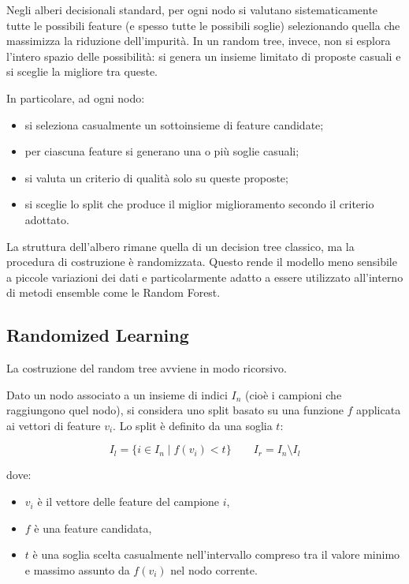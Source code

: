 Negli alberi decisionali standard, per ogni nodo si valutano sistematicamente tutte le possibili feature (e spesso tutte le possibili soglie) selezionando quella che massimizza la riduzione dell’impurità. In un random tree, invece, non si esplora l’intero spazio delle possibilità: si genera un insieme limitato di proposte casuali e si sceglie la migliore tra queste.

In particolare, ad ogni nodo:
\begin{itemize}
    \item si seleziona casualmente un sottoinsieme di feature candidate;
    \item per ciascuna feature si generano una o più soglie casuali;
    \item si valuta un criterio di qualità solo su queste proposte;
    \item si sceglie lo split che produce il miglior miglioramento secondo il criterio adottato.
\end{itemize}

La struttura dell’albero rimane quella di un decision tree classico, ma la procedura di costruzione è randomizzata. Questo rende il modello meno sensibile a piccole variazioni dei dati e particolarmente adatto a essere utilizzato all’interno di metodi ensemble come le Random Forest.

\subsection{Randomized Learning}

La costruzione del random tree avviene in modo ricorsivo. 

Dato un nodo associato a un insieme di indici $I_n$ (cioè i campioni che raggiungono quel nodo), si considera uno split basato su una funzione $f$ applicata ai vettori di feature $v_i$. Lo split è definito da una soglia $t$:

\[
I_l = \{ i \in I_n \mid f(v_i) < t \}
\qquad
I_r = I_n \setminus I_l
\]

dove:
\begin{itemize}
    \item $v_i$ è il vettore delle feature del campione $i$,
    \item $f$ è una feature candidata,
    \item $t$ è una soglia scelta casualmente nell’intervallo compreso tra il valore minimo e massimo assunto da $f(v_i)$ nel nodo corrente.
\end{itemize}


